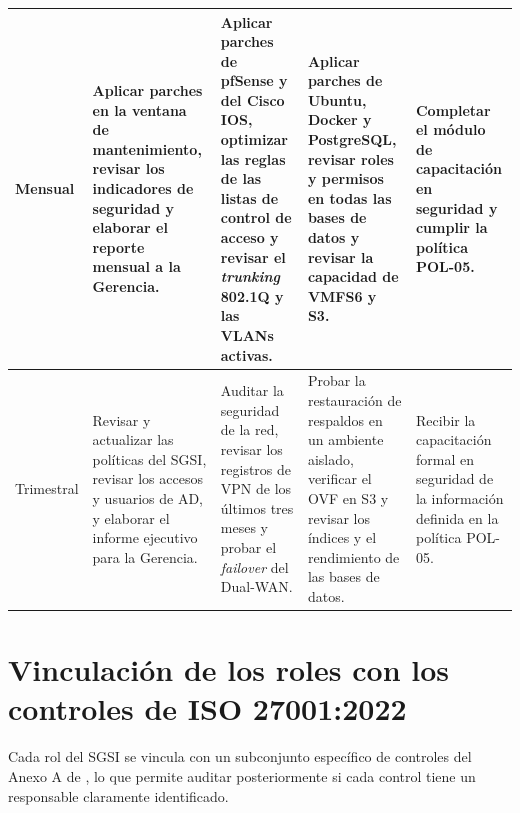 \documentclass[11pt, a4paper, oneside]{report}
\begin{document}
\begin{landscape}
\begin{xltabular}{\linewidth}{@{}|L{1.8cm}|X|X|X|X|@{}}
{\small Mensual} & {\small Aplicar parches en la ventana de mantenimiento, revisar los indicadores de seguridad y elaborar el reporte mensual a la Gerencia.} & {\small Aplicar parches de pfSense y del Cisco IOS, optimizar las reglas de las listas de control de acceso y revisar el \textit{trunking} 802.1Q y las VLANs activas.} & {\small Aplicar parches de Ubuntu, Docker y PostgreSQL, revisar roles y permisos en todas las bases de datos y revisar la capacidad de VMFS6 y S3.} & {\small Completar el módulo de capacitación en seguridad y cumplir la política POL-05.} \\ \hline

{\small Trimestral} & {\small Revisar y actualizar las políticas del SGSI, revisar los accesos y usuarios de AD, y elaborar el informe ejecutivo para la Gerencia.} & {\small Auditar la seguridad de la red, revisar los registros de VPN de los últimos tres meses y probar el \textit{failover} del Dual-WAN.} & {\small Probar la restauración de respaldos en un ambiente aislado, verificar el OVF en S3 y revisar los índices y el rendimiento de las bases de datos.} & {\small Recibir la capacitación formal en seguridad de la información definida en la política POL-05.} \\ \hline

\end{xltabular}

\normalsize
\end{landscape}

\section{Vinculación de los roles con los controles de ISO 27001:2022}

Cada rol del SGSI se vincula con un subconjunto específico de controles del Anexo A de \citet{iso27001}, lo que permite auditar posteriormente si cada control tiene un responsable claramente identificado.

\renewcommand{\arraystretch}{1.3}
\footnotesize
{}
\end{document}
